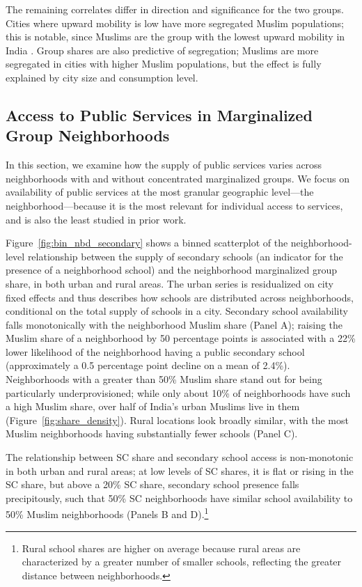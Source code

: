 \documentclass[12pt]{article}
\begin{document}
  The remaining correlates differ in direction and significance for the two groups. Cities where upward mobility is low have more segregated Muslim populations; this is notable, since Muslims are the group with the lowest upward mobility in India \citep{anr2022mob}. Group shares are also predictive of segregation; Muslims are more segregated in cities with higher Muslim populations, but the effect is fully explained by city size and consumption level. 

\subsection{Access to Public Services in Marginalized Group Neighborhoods}
\label{sec:res_pgs}

In this section, we examine how the supply of public services varies across neighborhoods with and without concentrated marginalized groups. We focus on availability of public services at the most granular geographic level---the neighborhood---because it is the most relevant for individual access to services, and is also the least studied in prior work.

Figure~\ref{fig:bin_nbd_secondary} shows a binned scatterplot of the neighborhood-level relationship between the supply of secondary schools (an indicator for the presence of a neighborhood school) and the neighborhood marginalized group share, in both urban and rural areas. The urban series is residualized on city fixed effects and thus describes how schools are distributed across neighborhoods, conditional on the total supply of schools in a city. Secondary school availability falls monotonically with the neighborhood Muslim share (Panel A); raising the Muslim share of a neighborhood by 50 percentage points is associated with a 22\% lower likelihood of the neighborhood having a public secondary school (approximately a 0.5 percentage point decline on a mean of 2.4\%). Neighborhoods with a greater than 50\% Muslim share stand out for being particularly underprovisioned; while only about 10\% of neighborhoods have such a high Muslim share, over half of India's urban Muslims live in them (Figure~\ref{fig:share_density}). Rural locations look broadly similar, with the most Muslim neighborhoods having substantially fewer schools (Panel C).

The relationship between SC share and secondary school access is non-monotonic in both urban and rural areas; at low levels of SC shares, it is flat or rising in the SC share, but above a 20\% SC share, secondary school presence falls precipitously, such that 50\% SC neighborhoods have similar school availability to 50\% Muslim neighborhoods (Panels B and D).\footnote{Rural school shares are higher on average because rural areas are characterized by a greater number of smaller schools, reflecting the greater distance between neighborhoods.}
\end{document}
